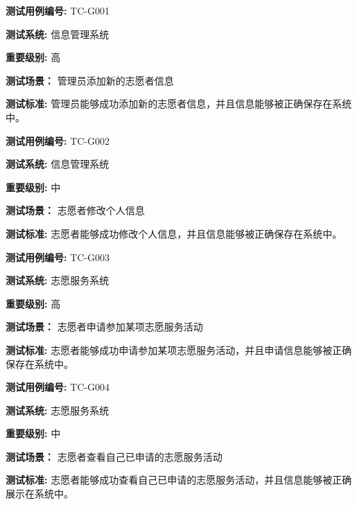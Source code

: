 \begin{framed} \textbf{测试用例编号:} TC-G001

\textbf{测试系统:} 信息管理系统

\textbf{重要级别:} 高

\textbf{测试场景：} 管理员添加新的志愿者信息

\textbf{测试标准:} 管理员能够成功添加新的志愿者信息，并且信息能够被正确保存在系统中。

\begin{center}  \end{center} \end{framed}

\begin{framed} \textbf{测试用例编号:} TC-G002

\textbf{测试系统:} 信息管理系统

\textbf{重要级别:} 中

\textbf{测试场景：} 志愿者修改个人信息

\textbf{测试标准:} 志愿者能够成功修改个人信息，并且信息能够被正确保存在系统中。

\begin{center}  \end{center} \end{framed}

\begin{framed} \textbf{测试用例编号:} TC-G003

\textbf{测试系统:} 志愿服务系统

\textbf{重要级别:} 高

\textbf{测试场景：} 志愿者申请参加某项志愿服务活动

\textbf{测试标准:} 志愿者能够成功申请参加某项志愿服务活动，并且申请信息能够被正确保存在系统中。

\begin{center}  \end{center} \end{framed}

\begin{framed} \textbf{测试用例编号:} TC-G004

\textbf{测试系统:} 志愿服务系统

\textbf{重要级别:} 中

\textbf{测试场景：} 志愿者查看自己已申请的志愿服务活动

\textbf{测试标准:} 志愿者能够成功查看自己已申请的志愿服务活动，并且信息能够被正确展示在系统中。

\begin{center}  \end{center} \end{framed}


